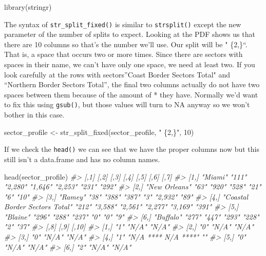 \documentclass[
  12pt,
]{book}
\newenvironment{Shaded}{\begin{snugshade}}{\end{snugshade}}
\newcommand{\CommentTok}[1]{\textcolor[rgb]{0.37,0.37,0.37}{\textit{#1}}}
\newcommand{\DecValTok}[1]{\textcolor[rgb]{0.06,0.06,0.06}{#1}}
\newcommand{\FunctionTok}[1]{\textcolor[rgb]{0,0,0}{#1}}
\newcommand{\NormalTok}[1]{#1}
\newcommand{\OtherTok}[1]{\textcolor[rgb]{0.37,0.37,0.37}{#1}}
\newcommand{\StringTok}[1]{\textcolor[rgb]{0.5,0.5,0.5}{#1}}
\begin{document}
\begin{Shaded}
\begin{Highlighting}[]
\FunctionTok{library}\NormalTok{(stringr)}
\end{Highlighting}
\end{Shaded}

The syntax of \texttt{str\_split\_fixed()} is similar to \texttt{strsplit()} except the new parameter of the number of splits to expect. Looking at the PDF shows us that there are 10 columns so that's the number we'll use. Our split will be " \{2,\}``. That is, a space that occurs two or more times. Since there are sectors with spaces in their name, we can't have only one space, we need at least two. If you look carefully at the rows with sectors''Coast Border Sectors Total" and ``Northern Border Sectors Total'', the final two columns actually do not have two spaces between them because of the amount of * they have. Normally we'd want to fix this using \texttt{gsub()}, but those values will turn to NA anyway so we won't bother in this case.

\begin{Shaded}
\begin{Highlighting}[]
\NormalTok{sector\_profile }\OtherTok{\textless{}{-}} \FunctionTok{str\_split\_fixed}\NormalTok{(sector\_profile, }\StringTok{" \{2,\}"}\NormalTok{, }\DecValTok{10}\NormalTok{)}
\end{Highlighting}
\end{Shaded}

If we check the \texttt{head()} we can see that we have the proper columns now but this still isn't a data.frame and has no column names.

\begin{Shaded}
\begin{Highlighting}[]
\FunctionTok{head}\NormalTok{(sector\_profile)}
\CommentTok{\#\textgreater{}      [,1]                           [,2]  [,3]    [,4]    [,5]    [,6]    [,7] }
\CommentTok{\#\textgreater{} [1,] "Miami"                        "111" "2,280" "1,646" "2,253" "231"   "292"}
\CommentTok{\#\textgreater{} [2,] "New Orleans"                  "63"  "920"   "528"   "21"    "6"     "10" }
\CommentTok{\#\textgreater{} [3,] "Ramey"                        "38"  "388"   "387"   "3"     "2,932" "89" }
\CommentTok{\#\textgreater{} [4,] "Coastal Border Sectors Total" "212" "3,588" "2,561" "2,277" "3,169" "391"}
\CommentTok{\#\textgreater{} [5,] "Blaine"                       "296" "288"   "237"   "0"     "0"     "9"  }
\CommentTok{\#\textgreater{} [6,] "Buffalo"                      "277" "447"   "293"   "228"   "2"     "37" }
\CommentTok{\#\textgreater{}      [,8] [,9]                [,10]}
\CommentTok{\#\textgreater{} [1,] "1"  "N/A"               "N/A"}
\CommentTok{\#\textgreater{} [2,] "0"  "N/A"               "N/A"}
\CommentTok{\#\textgreater{} [3,] "0"  "N/A"               "N/A"}
\CommentTok{\#\textgreater{} [4,] "1"  "N/A **** N/A ****" ""   }
\CommentTok{\#\textgreater{} [5,] "0"  "N/A"               "N/A"}
\CommentTok{\#\textgreater{} [6,] "2"  "N/A"               "N/A"}
\end{Highlighting}
\end{Shaded}
\end{document}
